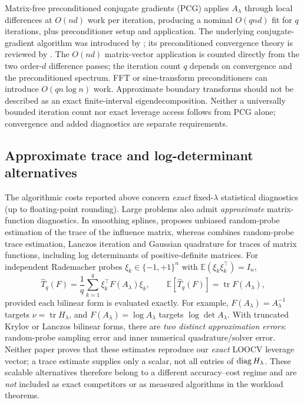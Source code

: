 Matrix-free preconditioned conjugate gradients (PCG) applies $A_\lambda$ through local differences at $O(nd)$ work per iteration, producing a nominal $O(qnd)$ fit for $q$ iterations, plus preconditioner setup and application. The underlying conjugate-gradient algorithm was introduced by \citet[Sec.~3]{hestenesstiefel1952}; its preconditioned convergence theory is reviewed by \citet{saad2003}. The $O(nd)$ matrix-vector application is counted directly from the two order-$d$ difference passes; the iteration count $q$ depends on convergence and the preconditioned spectrum. FFT or sine-transform preconditioners can introduce $O(qn\log n)$ work. Approximate boundary transforms should not be described as an exact finite-interval eigendecomposition. Neither a universally bounded iteration count nor exact leverage access follows from PCG alone; convergence and added diagnostics are separate requirements.

\subsection{Approximate trace and log-determinant alternatives}
\label{sec:approximate-diagnostics}
The algorithmic costs reported above concern \emph{exact}
fixed-$\lambda$ statistical diagnostics (up to floating-point
rounding). Large problems also admit \emph{approximate}
matrix-function diagnostics. In smoothing splines,
\citet{hutchinson1990} proposes unbiased random-probe
estimation of the trace of the influence matrix,
whereas \citet{ubaru2017} combines random-probe
trace estimation, Lanczos iteration and Gaussian
quadrature for traces of matrix functions,
including log determinants of positive-definite matrices.
For independent Rademacher probes
$\xi_k\in\{-1,+1\}^n$ with
$\mathbb E(\xi_k\xi_k^\top)=I_n$,
\begin{equation}\label{eq:stochastic-trace}
\widehat T_q(F)=\frac1q\sum_{k=1}^q
\xi_k^\top F(A_\lambda)\xi_k,
\qquad
\mathbb E[\widehat T_q(F)]=
\operatorname{tr}F(A_\lambda),
\end{equation}
provided each bilinear form is evaluated exactly.
For example, $F(A_\lambda)=A_\lambda^{-1}$
targets $\nu=\operatorname{tr}H_\lambda$,
and $F(A_\lambda)=\log A_\lambda$
targets $\log\det A_\lambda$.
With truncated Krylov or Lanczos bilinear forms,
there are \emph{two distinct approximation errors}:
random-probe sampling error and inner numerical
quadrature/solver error. Neither paper proves that
these estimates reproduce our \emph{exact}
LOOCV leverage vector; a trace estimate supplies
only a scalar, not all entries of $\operatorname{diag} H_\lambda$.
These scalable alternatives therefore belong to
a different accuracy--cost regime and are
\emph{not} included as exact competitors or as
measured algorithms in the workload theorems.

